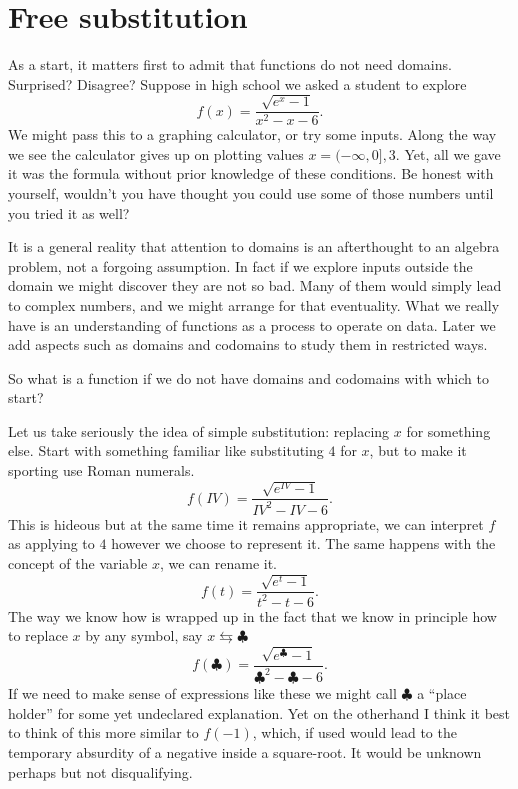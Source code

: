 \section{Free substitution}
As a start, it matters first to admit that functions do not need 
domains.  Surprised? Disagree?    Suppose in high school we asked 
a student to  explore
\[
    f(x) = \frac{\sqrt{e^x-1}}{x^2-x-6}.
\]
We might pass this to a graphing calculator, or try some inputs. Along the way
we see the calculator gives up on plotting values $x=(-\infty,0],3$.  Yet, all
we gave it was the formula without prior knowledge of these conditions.  
Be honest with yourself, wouldn't you have thought you could use some of 
those numbers until you tried it as well?

It is a general reality that attention to domains is an af\-ter\-thought to an
algebra problem, not a forgoing assumption.  In fact if we explore inputs
outside the domain we might discover they are not so bad.  Many of them would
simply lead to complex numbers, and we might arrange for that eventuality.  
What we really have is an understanding of functions as a process to operate 
on data.  Later  we add aspects such as domains and codomains to study them in restricted ways.

So what is a function if we do not have domains and codomains with which to start?

Let us take seriously the idea of simple substitution: replacing $x$ for something else.
Start with something familiar like substituting $4$ for $x$, but to make 
it sporting use Roman numerals.
\[
    f(IV) = \frac{\sqrt{e^{IV}-1}}{IV^2-IV-6}.
\]
This is hideous but at the same time it remains appropriate, we can interpret 
$f$ as applying to $4$ however we choose to represent it.  The same happens with 
the concept of the variable $x$, we can rename it.
\[
    f(t) = \frac{\sqrt{e^{t}-1}}{t^2-t-6}.
\]
The way we know how is wrapped up in the fact that we know 
in principle how to replace $x$ by any symbol, say $x\leftrightarrows \clubsuit$
\[
    f(\clubsuit) = \frac{\sqrt{e^{\clubsuit}-1}}{\clubsuit^2-\clubsuit-6}.
\]
If we need to make sense of expressions like these we might call $\clubsuit$ 
a ``place holder'' for some yet undeclared explanation.  Yet on the otherhand 
I think it best to think of this more similar to  $f(-1)$, which, if used 
would lead to the temporary absurdity of a negative inside a square-root.
It would be unknown perhaps but not disqualifying.

